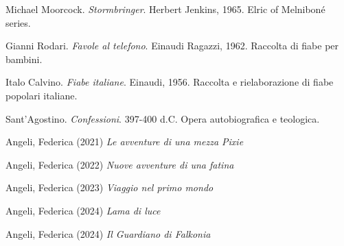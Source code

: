 Michael Moorcock.
\textit{Stormbringer}.
Herbert Jenkins, 1965.
Elric of Melniboné series.

Gianni Rodari.
\textit{Favole al telefono}.
Einaudi Ragazzi, 1962.
Raccolta di fiabe per bambini.

Italo Calvino.
\textit{Fiabe italiane}.
Einaudi, 1956.
Raccolta e rielaborazione di fiabe popolari italiane.

Sant'Agostino.
\textit{Confessioni}.
397-400 d.C.
Opera autobiografica e teologica.


Angeli, Federica (2021)
\textit{Le avventure di una mezza Pixie}

Angeli, Federica (2022)
\textit{Nuove avventure di una fatina}

Angeli, Federica (2023)
\textit{Viaggio nel primo mondo}

Angeli, Federica (2024)
\textit{Lama di luce}

Angeli, Federica (2024)
\textit{Il Guardiano di Falkonia}
